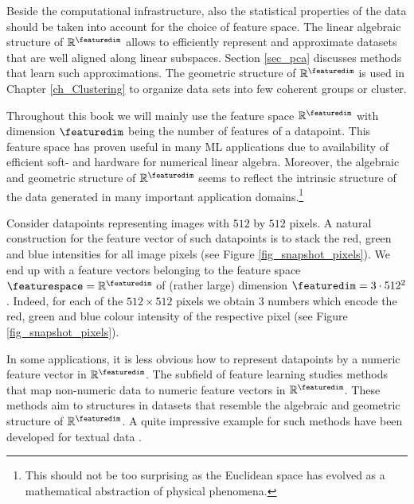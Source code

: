 \documentclass[12pt]{report}
\newcommand{\featurelen}{\featuredim}
\begin{document}
Beside the computational infrastructure, also the statistical properties 
of the data should be taken into account for the choice of feature space. 
The linear algebraic structure of $\mathbb{R}^{\featuredim}$ allows to 
efficiently represent and approximate datasets that are well aligned 
along linear subspaces. Section \ref{sec_pca} discusses methods that learn 
such approximations. The geometric structure of $\mathbb{R}^{\featuredim}$ 
is used in Chapter \ref{ch_Clustering} to organize data sets into few coherent groups 
or cluster. 

Throughout this book we will mainly use the feature space $\mathbb{R}^{\featuredim}$ 
with dimension $\featuredim$ being the number of features of a datapoint. This 
feature space has proven useful in many ML applications due to availability 
of efficient soft- and hardware for numerical linear algebra. Moreover, the 
algebraic and geometric structure of $\mathbb{R}^{\featuredim}$ seems to 
reflect the intrinsic structure of the data generated in many important 
application domains.\footnote{This should not be too surprising as the 
Euclidean space has evolved as a mathematical abstraction of physical phenomena.}



Consider datapoints representing images with $512$ by $512$ pixels. 
A natural construction for the feature vector of such datapoints is to 
stack the red, green and blue intensities for all image pixels (see Figure \ref{fig_snapshot_pixels}). 
We end up with a feature vectors belonging to the feature space 
$\featurespace=\mathbb{R}^{\featuredim}$ of (rather large) dimension 
$\featuredim = 3 \cdot 512^2$. Indeed, for each of the $512 \times 512$ 
pixels we obtain $3$ numbers which encode the red, green and blue colour 
intensity of the respective pixel (see Figure \ref{fig_snapshot_pixels}). 

In some applications, it is less obvious how to represent datapoints 
by a numeric feature vector in $\mathbb{R}^{\featurelen}$. The subfield 
of feature learning studies methods that map non-numeric data to numeric 
feature vectors in $\mathbb{R}^{\featuredim}$. These methods aim to 
structures in datasets that resemble the algebraic and geometric structure 
of $\mathbb{R}^{\featurelen}$. A quite impressive example for such methods 
have been developed for textual data \cite{Mikolov2013}. 
\end{document}
